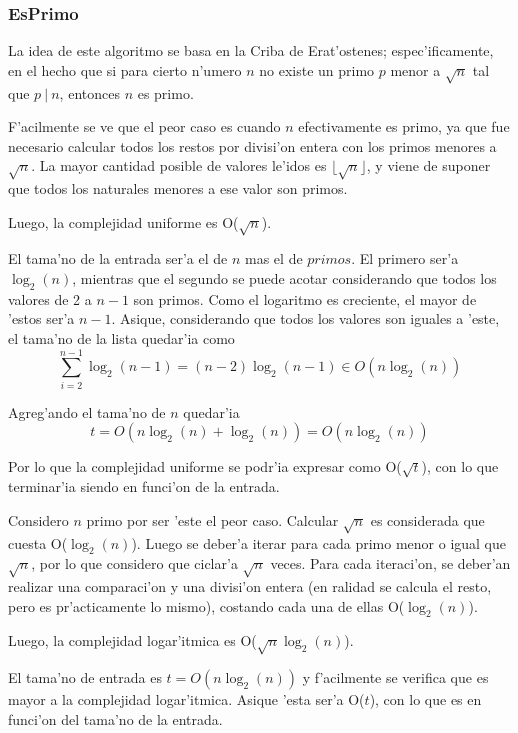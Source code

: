 \subsubsection{EsPrimo}


La idea de este algoritmo se basa en la Criba de Erat'ostenes; espec'ificamente, en el hecho que si para cierto n'umero $n$ no existe un primo $p$ menor a $\sqrt{n}$ tal que $p\ |\ n$, entonces $n$ es primo. 

F'acilmente se ve que el peor caso es cuando $n$ efectivamente es primo, ya que fue necesario calcular todos los restos por divisi'on entera con los primos menores a $\sqrt{n}$. La mayor cantidad posible de valores le'idos es $\lfloor\sqrt{n}\rfloor$, y viene de suponer que todos los naturales menores a ese valor son primos.

Luego, la complejidad uniforme es O($\sqrt{n}$).

El tama'no de la entrada ser'a el de $n$ mas el de $primos$. El primero ser'a $\log_2(n)$, mientras que el segundo se puede acotar considerando que todos los valores de 2 a $n-1$ son primos. Como el logaritmo es creciente, el mayor de 'estos ser'a $n-1$. Asique, considerando que todos los valores son iguales a 'este, el tama'no de la lista quedar'ia como
$$\sum_{i=2}^{n-1} \log_2(n-1) = (n-2)\log_2(n-1) \in O(n\log_2(n))$$

Agreg'ando el tama'no de $n$ quedar'ia
$$t = O(n\log_2(n) + \log_2(n)) = O(n\log_2(n))$$

Por lo que la complejidad uniforme se podr'ia expresar como O($\sqrt{t}$), con lo que terminar'ia siendo  en funci'on de la entrada.

\vspace{2em}


Considero $n$ primo por ser 'este el peor caso. Calcular $\sqrt{n}$ es considerada que cuesta O($\log_2(n)$). Luego se deber'a iterar para cada primo menor o igual que $\sqrt{n}$, por lo que considero que ciclar'a $\sqrt{n}$ veces. Para cada iteraci'on, se deber'an realizar una comparaci'on y una divisi'on entera (en ralidad se calcula el resto, pero es pr'acticamente lo mismo), costando cada una de ellas O($\log_2(n)$). 

Luego, la complejidad logar'itmica es O($\sqrt{n}\log_2(n)$).

El tama'no de entrada es $t = O(n\log_2(n))$ y f'acilmente se verifica que es mayor a la complejidad logar'itmica. Asique 'esta ser'a O($t$), con lo que es  en funci'on del tama'no de la entrada.


